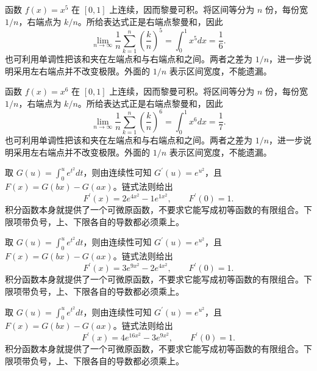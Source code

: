 \documentclass[12pt,fontset=fandol]{ctexart}
\begin{document}
\begin{solve}\label{ans:c17q7}
函数 $f(x)=x^{5}$ 在 $[0,1]$ 上连续，因而黎曼可积。将区间等分为 $n$ 份，每份宽 $1/n$，右端点为 $k/n$。所给表达式正是右端点黎曼和，因此
\[
\lim_{n\to\infty}\frac1n\sum_{k=1}^n\left(\frac kn\right)^{5}=\int_0^1x^{5}dx=\frac{1}{6}.
\]
也可利用单调性把该和夹在左端点和与右端点和之间。两者之差为 $1/n$，进一步说明采用左右端点并不改变极限。外面的 $1/n$ 表示区间宽度，不能遗漏。
\end{solve}

\begin{solve}\label{ans:c17q8}
函数 $f(x)=x^{6}$ 在 $[0,1]$ 上连续，因而黎曼可积。将区间等分为 $n$ 份，每份宽 $1/n$，右端点为 $k/n$。所给表达式正是右端点黎曼和，因此
\[
\lim_{n\to\infty}\frac1n\sum_{k=1}^n\left(\frac kn\right)^{6}=\int_0^1x^{6}dx=\frac{1}{7}.
\]
也可利用单调性把该和夹在左端点和与右端点和之间。两者之差为 $1/n$，进一步说明采用左右端点并不改变极限。外面的 $1/n$ 表示区间宽度，不能遗漏。
\end{solve}

\begin{solve}\label{ans:c17q9}
取 $G(u)=\int_0^u e^{t^2}dt$，则由连续性可知 $G^{\prime}(u)=e^{u^2}$，且 $F(x)=G(bx)-G(ax)$。链式法则给出
\[
F^{\prime}(x)=2e^{4x^2}-1e^{1x^2},\qquad F^{\prime}(0)=1.
\]
积分函数本身就提供了一个可微原函数，不要求它能写成初等函数的有限组合。下限项带负号，上、下限各自的导数都必须乘上。
\end{solve}

\begin{solve}\label{ans:c17q10}
取 $G(u)=\int_0^u e^{t^2}dt$，则由连续性可知 $G^{\prime}(u)=e^{u^2}$，且 $F(x)=G(bx)-G(ax)$。链式法则给出
\[
F^{\prime}(x)=3e^{9x^2}-2e^{4x^2},\qquad F^{\prime}(0)=1.
\]
积分函数本身就提供了一个可微原函数，不要求它能写成初等函数的有限组合。下限项带负号，上、下限各自的导数都必须乘上。
\end{solve}

\begin{solve}\label{ans:c17q11}
取 $G(u)=\int_0^u e^{t^2}dt$，则由连续性可知 $G^{\prime}(u)=e^{u^2}$，且 $F(x)=G(bx)-G(ax)$。链式法则给出
\[
F^{\prime}(x)=4e^{16x^2}-3e^{9x^2},\qquad F^{\prime}(0)=1.
\]
积分函数本身就提供了一个可微原函数，不要求它能写成初等函数的有限组合。下限项带负号，上、下限各自的导数都必须乘上。
\end{solve}
\end{document}
